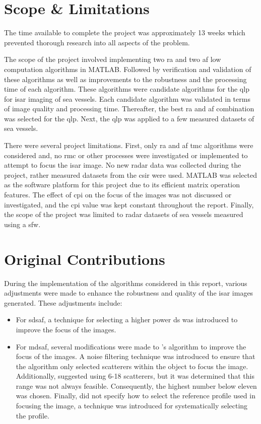 \documentclass[class=report,11pt,crop=false]{standalone}
\begin{document}
\section{Scope \& Limitations}
The time available to complete the project was approximately 13 weeks which prevented thorough research into all aspects of the problem. 

The scope of the project involved implementing two \gls{ra} and two \gls{af} low computation algorithms in \textsc{MATLAB}. Followed by verification and validation of these algorithms as well as improvements to the robustness and the processing time of each algorithm. These algorithms were candidate algorithms for the \gls{qlp} for \gls{isar} imaging of sea vessels. Each candidate algorithm was validated in terms of image quality and processing time. Thereafter, the best \gls{ra} and \gls{af} combination was selected for the \gls{qlp}. Next, the \gls{qlp} was applied to a few measured datasets of sea vessels.

There were several project limitations. First, only \gls{ra} and \gls{af} \gls{tmc} algorithms were considered and, no \gls{rmc} or other processes were investigated or implemented to attempt to focus the \gls{isar} image. No new radar data was collected during the project, rather measured datasets from the \gls{csir} were used. \textsc{MATLAB} was selected as the software platform for this project due to its efficient matrix operation features. The effect of \gls{cpi} on the focus of the images was not discussed or investigated, and the \gls{cpi} value was kept constant throughout the report. Finally, the scope of the project was limited to radar datasets of sea vessels measured using a \gls{sfw}.
\section{Original Contributions}
During the implementation of the algorithms considered in this report, various adjustments were made to enhance the robustness and quality of the \gls{isar} images generated. These adjustments include:
\begin{itemize}
    \item For \gls{sdsaf}, a technique for selecting a higher power \gls{ds} was introduced to improve the focus of the images.
    \item For \gls{mdsaf}, several modifications were made to \cite{yuan_AF}'s algorithm to improve the focus of the images. A noise filtering technique was introduced to ensure that the algorithm only selected scatterers within the object to focus the image. Additionally, \cite{yuan_AF} suggested using 6-18 scatterers, but it was determined that this range was not always feasible. Consequently, the highest number below eleven was chosen.  Finally, \cite{yuan_AF} did not specify how to select the reference profile used in focusing the image, a technique was introduced for systematically selecting the profile. 
\end{itemize}
\end{document}
